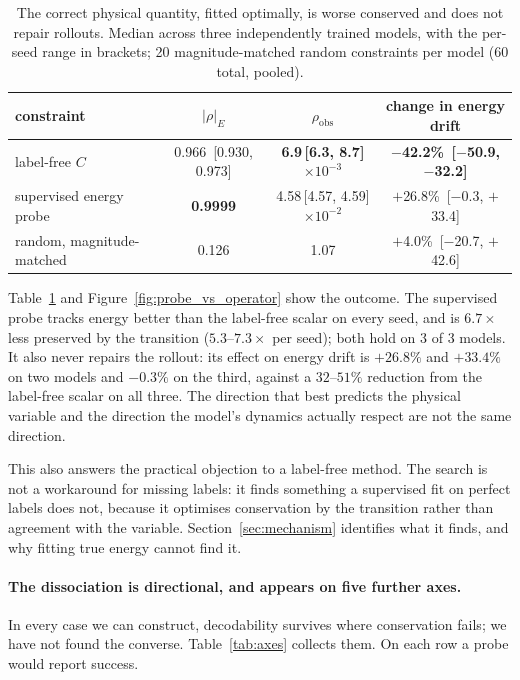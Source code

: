 \begin{table}[t]
\centering\small
\caption{The correct physical quantity, fitted optimally, is worse conserved and does not repair
rollouts. Median across three independently trained models, with the per-seed range in brackets;
20 magnitude-matched random constraints per model (60 total, pooled).}
\label{tab:supervised}
\begin{tabular}{lccc}
\toprule
constraint & $|\rho|_E$ & $\rho_{\mathrm{obs}}$ & change in energy drift \\
\midrule
label-free $C$ & 0.966 \,[0.930, 0.973] & \textbf{6.9\,[6.3, 8.7]$\times10^{-3}$} & \textbf{$-$42.2\% \,[$-$50.9, $-$32.2]} \\
supervised energy probe & \textbf{0.9999} & 4.58\,[4.57, 4.59]$\times10^{-2}$ & $+$26.8\% \,[$-$0.3, $+$33.4] \\
random, magnitude-matched & 0.126 & 1.07 & $+$4.0\% \,[$-$20.7, $+$42.6] \\
\bottomrule
\end{tabular}
\end{table}

Table~\ref{tab:supervised} and Figure~\ref{fig:probe_vs_operator} show the outcome. The supervised
probe tracks energy better than the label-free scalar on every seed, and is $6.7\times$ less preserved
by the transition ($5.3$--$7.3\times$ per seed); both hold on 3 of 3 models. It also never repairs the
rollout: its effect on energy drift is $+26.8\%$ and $+33.4\%$ on two models and $-0.3\%$ on the third,
against a $32$--$51\%$ reduction from the label-free scalar on all three. The direction that best
predicts the physical variable and the direction the model's dynamics actually respect are not the
same direction.

This also answers the practical objection to a label-free method. The search is not a workaround for
missing labels: it finds something a supervised fit on perfect labels does not, because it optimises
conservation by the transition rather than agreement with the variable.
Section~\ref{sec:mechanism} identifies what it finds, and why fitting true energy cannot find it.

\paragraph{The dissociation is directional, and appears on five further axes.}
In every case we can construct, decodability survives where conservation fails; we have not found the
converse. Table~\ref{tab:axes} collects them. On each row a probe would report success.

